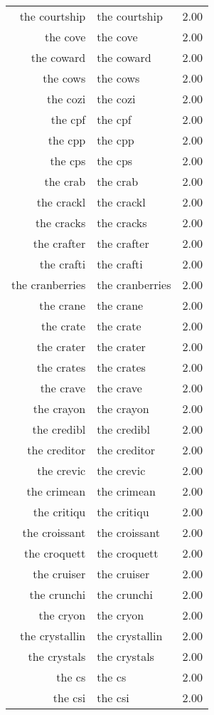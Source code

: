 \begin{table}[ht]
\begin{tabular}{rlr}
  the courtship & the courtship & 2.00 \\ 
  the cove & the cove & 2.00 \\ 
  the coward & the coward & 2.00 \\ 
  the cows & the cows & 2.00 \\ 
  the cozi & the cozi & 2.00 \\ 
  the cpf & the cpf & 2.00 \\ 
  the cpp & the cpp & 2.00 \\ 
  the cps & the cps & 2.00 \\ 
  the crab & the crab & 2.00 \\ 
  the crackl & the crackl & 2.00 \\ 
  the cracks & the cracks & 2.00 \\ 
  the crafter & the crafter & 2.00 \\ 
  the crafti & the crafti & 2.00 \\ 
  the cranberries & the cranberries & 2.00 \\ 
  the crane & the crane & 2.00 \\ 
  the crate & the crate & 2.00 \\ 
  the crater & the crater & 2.00 \\ 
  the crates & the crates & 2.00 \\ 
  the crave & the crave & 2.00 \\ 
  the crayon & the crayon & 2.00 \\ 
  the credibl & the credibl & 2.00 \\ 
  the creditor & the creditor & 2.00 \\ 
  the crevic & the crevic & 2.00 \\ 
  the crimean & the crimean & 2.00 \\ 
  the critiqu & the critiqu & 2.00 \\ 
  the croissant & the croissant & 2.00 \\ 
  the croquett & the croquett & 2.00 \\ 
  the cruiser & the cruiser & 2.00 \\ 
  the crunchi & the crunchi & 2.00 \\ 
  the cryon & the cryon & 2.00 \\ 
  the crystallin & the crystallin & 2.00 \\ 
  the crystals & the crystals & 2.00 \\ 
  the cs & the cs & 2.00 \\ 
  the csi & the csi & 2.00 \\ 

\end{tabular}
\end{table}
